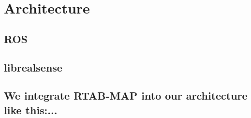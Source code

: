 \documentclass[main.tex]{subfiles}
\begin{document}
\section{Architecture}

\subsection*{ROS}
\subsection*{librealsense}
\subsection*{We integrate RTAB-MAP into our architecture like this:...}
\end{document}
